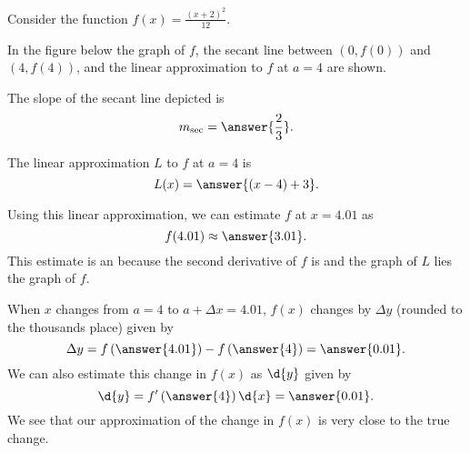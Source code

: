 \documentclass{ximera}
\author{Nela Lakos \and Kyle Parsons}
\begin{document}
\begin{exercise}

Consider the function $f(x) = \frac{(x+2)^2}{12}$.

In the figure below the graph of $f$, the secant line between $(0,f(0))$ and $(4,f(4))$, and the linear approximation to $f$ at $a=4$ are shown.

\begin{image}
\end{image}

The slope of the secant line depicted is
\[
m_{\textnormal{sec}} = \answer{\frac{2}{3}}.
\]

The linear approximation $L$ to $f$ at $a=4$ is
\[
L(x) = \answer{(x-4) + 3}.
\]

Using this linear approximation, we can estimate $f$ at $x=4.01$ as
\[
f(4.01) \approx \answer{3.01}.
\]
This estimate is an  because the second derivative of $f$ is  and the graph of $L$ lies  the graph of $f$.

When $x$ changes from $a=4$ to $a+\Delta x=4.01$, $f(x)$ changes by $\Delta y$ (rounded to the thousands place) given by
\[
\Delta y = f\left(\answer{4.01}\right) - f\left(\answer{4}\right) = \answer{0.01}.
\]
We can also estimate this change in $f(x)$ as $\d{y}$ given by
\[
\d{y} = f'\left(\answer{4}\right)\d{x} = \answer{0.01}.
\]
We see that our approximation of the change in $f(x)$ is very close to the true change.

\end{exercise}
\end{document}
